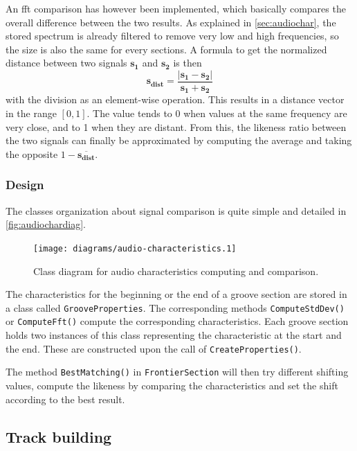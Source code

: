 An \gls{fft} comparison has however been implemented, which basically compares the overall difference between the two results. As explained in \autoref{sec:audiochar}, the stored spectrum is already filtered to remove very low and high frequencies, so the size is also the same for every sections. A formula to get the normalized distance between two signals $\mathbf{s_1}$ and $\mathbf{s_2}$ is then
\begin{equation}
\label{eq:fftcomp}
\mathbf{s_{dist}} = \frac{\left| \mathbf{s_1} - \mathbf{s_2} \right|}{\mathbf{s_1} + \mathbf{s_2}}
\end{equation}
with the division as an element-wise operation. This results in a distance vector in the range $[0,1]$. The value tends to 0 when values at the same frequency are very close, and to 1 when they are distant. From this, the likeness ratio between the two signals can finally be approximated by computing the average and taking the opposite $1 - \overline{\mathbf{s_{dist}}}$.

\subsubsection{Design}

The classes organization about signal comparison is quite simple and detailed in \autoref{fig:audiochardiag}.

\begin{figure}[!ht]
\centering
\texttt{[image: diagrams/audio-characteristics.1]}
\caption{Class diagram for audio characteristics computing and comparison.}
\label{fig:audiochardiag}
\end{figure}

The characteristics for the beginning or the end of a groove section are stored in a class called \texttt{GrooveProperties}. The corresponding methods \texttt{ComputeStdDev()} or \texttt{ComputeFft()} compute the corresponding characteristics. Each groove section holds two instances of this class representing the characteristic at the start and the end. These are constructed upon the call of \texttt{CreateProperties()}.

The method \texttt{BestMatching()} in \texttt{FrontierSection} will then try different shifting values, compute the likeness by comparing the characteristics and set the shift according to the best result.

\subsection{Track building}

